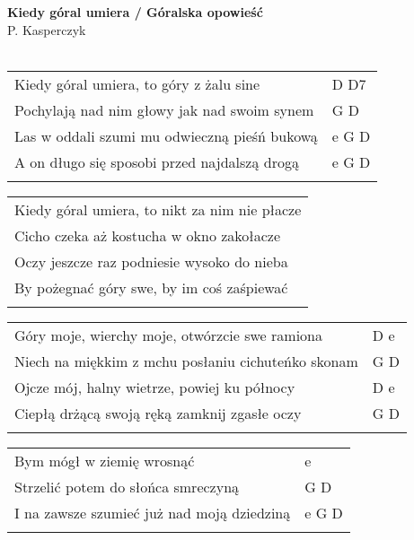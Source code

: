 \documentclass[a5paper]{article}
\begin{document}


\noindent
\fontsize{12pt}{15pt}\selectfont
\textbf{Kiedy góral umiera / Góralska opowieść} \\
\fontsize{8pt}{10pt}\selectfont
P. Kasperczyk \\ \\
\fontsize{10pt}{12pt}\selectfont
{}
\begin{tabular}{@{}p{9.5cm}p{3cm}@{}}
\noindent
Kiedy góral umiera, to góry z żalu sine & D D7 \\
Pochylają nad nim głowy jak nad swoim synem & G D \\
Las w oddali szumi mu odwieczną pieśń bukową & e G D \\
A on długo się sposobi przed najdalszą drogą & e G D \\ \\
\end{tabular}

\noindent
\begin{tabular}{@{}p{9.5cm}@{}}
Kiedy góral umiera, to nikt za nim nie płacze \\
Cicho czeka aż kostucha w okno zakołacze \\
Oczy jeszcze raz podniesie wysoko do nieba \\
By pożegnać góry swe, by im coś zaśpiewać \\ \\
\end{tabular}

\noindent
\begin{tabular}{@{}p{8.5cm}p{3cm}@{}}
Góry moje, wierchy moje, otwórzcie swe ramiona & D e \\
Niech na miękkim z mchu posłaniu cichuteńko skonam & G D \\
Ojcze mój, halny wietrze, powiej ku północy & D e \\
Ciepłą drżącą swoją ręką zamknij zgasłe oczy & G D \\ \\
\end{tabular}

\noindent
\begin{tabular}{@{}p{8.5cm}p{3cm}@{}}
Bym mógł w ziemię wrosnąć & e \\
Strzelić potem do słońca smreczyną & G D \\
I na zawsze szumieć już nad moją dziedziną & e G D \\ \\
\end{tabular}
\end{document}
